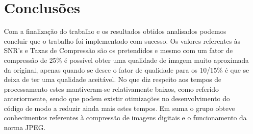 \documentclass[12pt,a4paper]{article}
\begin{document}
\section{Conclusões}
Com a finalização do trabalho e os resultados obtidos analisados podemos concluir que o trabalho foi implementado com sucesso. Os valores referentes às SNR's e Taxas de Compressão são os pretendidos e mesmo com um fator de compressão de 25\% é possível obter uma qualidade de imagem muito aproximada da original, apenas quando se desce o fator de qualidade para os 10/15\% é que se deixa de ter uma qualidade aceitável. No que diz respeito aos tempos de processamento estes mantiveram-se relativamente baixos, como referido anteriormente, sendo que podem existir otimizações no desenvolvimento do código de modo a reduzir ainda mais estes tempos. Em suma o grupo obteve conhecimentos referentes à compressão de imagens digitais e o funcionamento da norma JPEG. 
\end{document}
